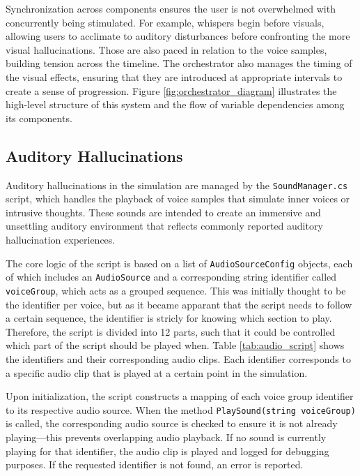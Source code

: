 Synchronization across components ensures the user is not overwhelmed with concurrently being stimulated. For example, whispers begin before visuals, allowing users to acclimate to auditory disturbances before confronting the more visual hallucinations. Those are also paced in relation to the voice samples, building tension across the timeline.
The orchestrator also manages the timing of the visual effects, ensuring that they are introduced at appropriate intervals to create a sense of progression. Figure \ref{fig:orchestrator_diagram} illustrates the high-level structure of this system and the flow of variable dependencies among its components.

\subsection{Auditory Hallucinations}

Auditory hallucinations in the simulation are managed by the \texttt{SoundManager.cs} script, which handles the playback of voice samples that simulate inner voices or intrusive thoughts. These sounds are intended to create an immersive and unsettling auditory environment that reflects commonly reported auditory hallucination experiences.

The core logic of the script is based on a list of \texttt{AudioSourceConfig} objects, each of which includes an \texttt{AudioSource} and a corresponding string identifier called \texttt{voiceGroup}, which acts as a grouped sequence. This was initially thought to be the identifier per voice, but as it became apparant that the script needs to follow a certain sequence, the identifier is stricly for knowing which section to play. Therefore, the script is divided into 12 parts, such that it could be controlled which part of the script should be played when. Table \ref{tab:audio_script} shows the identifiers and their corresponding audio clips. Each identifier corresponds to a specific audio clip that is played at a certain point in the simulation.

Upon initialization, the script constructs a mapping of each voice group identifier to its respective audio source. When the method \texttt{PlaySound(string voiceGroup)} is called, the corresponding audio source is checked to ensure it is not already playing—this prevents overlapping audio playback. If no sound is currently playing for that identifier, the audio clip is played and logged for debugging purposes. If the requested identifier is not found, an error is reported.

